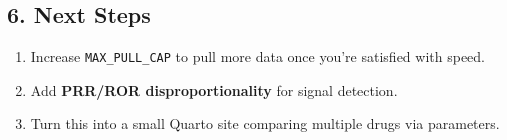 \documentclass[
  letterpaper,
  DIV=11,
  numbers=noendperiod]{scrartcl}
\providecommand{\tightlist}{%
  \setlength{\itemsep}{0pt}\setlength{\parskip}{0pt}}\usepackage{longtable,booktabs,array}
\begin{document}
\subsection{6. Next Steps}\label{next-steps}

\begin{enumerate}
\def\labelenumi{\arabic{enumi}.}
\tightlist
\item
  Increase \texttt{MAX\_PULL\_CAP} to pull more data once you're
  satisfied with speed.\\
\item
  Add \textbf{PRR/ROR disproportionality} for signal detection.\\
\item
  Turn this into a small Quarto site comparing multiple drugs via
  parameters.
\end{enumerate}
\end{document}
